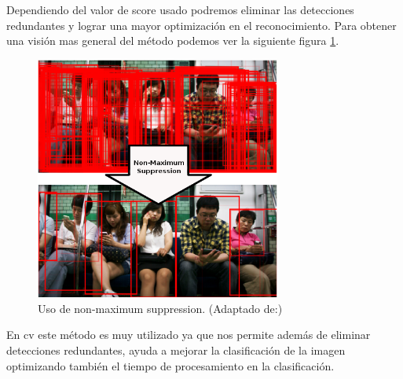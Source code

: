 Dependiendo del valor de score usado podremos eliminar las detecciones redundantes y lograr una mayor optimización  en el reconocimiento. Para obtener una visión mas general del método podemos ver la siguiente figura \ref{Fig: nonmaximumsuppression}.

\begin{figure}[H]
 \centering
  \includegraphics[height=8cm,keepaspectratio=true,clip=true]{imagenes/Logos/nms.png}
  \caption{Uso de non-maximum suppression. (Adaptado de:\citep{nms2})}
	\label{Fig: nonmaximumsuppression}
\end{figure}

En \ac{cv} este método es muy utilizado ya que nos permite además de eliminar detecciones redundantes, ayuda a mejorar la clasificación de la imagen optimizando también el tiempo de procesamiento en la clasificación.
